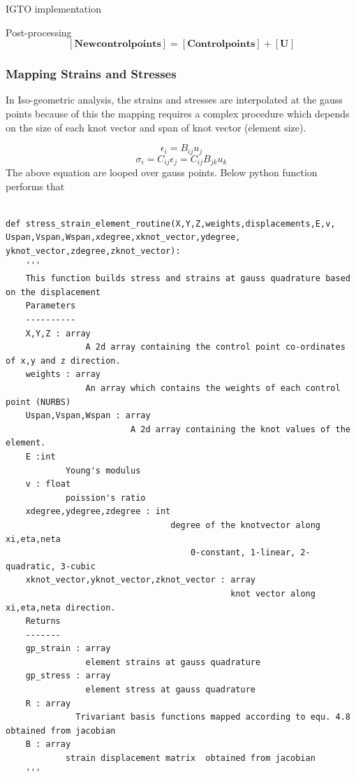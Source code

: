 \documentclass[a4paper,12pt,times]{article}
\begin{document}
\begin{section}{IGTO implementation}
\begin{subsection}{Post-processing}
\begin{equation}
\left[\mathbf{New control points }\right]=[\mathbf{Control points}]+[\mathbf{U}]
\end{equation}

\subsubsection{Mapping Strains and Stresses}
In Iso-geometric analysis, the strains and stresses are interpolated at the gauss points because of this the mapping requires a complex procedure which depends on the size of each knot vector and span of knot vector (element size).

\begin{equation}
\epsilon_{i}=B_{ij} u_{j}
\end{equation}
\begin{equation}
\sigma_{i}=C_{i j} \epsilon_{j}=C_{ij} B_{jk} u_{k}
\end{equation}
The above equation are looped over gauss points.
Below python function performs that

\begin{lstlisting}

def stress_strain_element_routine(X,Y,Z,weights,displacements,E,v,
Uspan,Vspan,Wspan,xdegree,xknot_vector,ydegree,
yknot_vector,zdegree,zknot_vector):
    '''
    This function builds stress and strains at gauss quadrature based on the displacement 
    Parameters
    ----------
    X,Y,Z : array
                A 2d array containing the control point co-ordinates of x,y and z direction. 
    weights : array
                An array which contains the weights of each control point (NURBS)
    Uspan,Vspan,Wspan : array
                         A 2d array containing the knot values of the element.
    E :int
            Young's modulus   
    v : float
            poission's ratio
    xdegree,ydegree,zdegree : int
                                 degree of the knotvector along xi,eta,neta
                                     0-constant, 1-linear, 2-quadratic, 3-cubic 
    xknot_vector,yknot_vector,zknot_vector : array
                                             knot vector along xi,eta,neta direction.
    Returns
    -------
    gp_strain : array
                element strains at gauss quadrature
    gp_stress : array
                element stress at gauss quadrature
    R : array   
              Trivariant basis functions mapped according to equ. 4.8  obtained from jacobian
    B : array
            strain displacement matrix  obtained from jacobian
    '''
\end{lstlisting}

\end{subsection}
\end{section}
\end{document}
